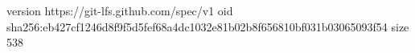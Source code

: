 version https://git-lfs.github.com/spec/v1
oid sha256:eb427cf1246d8f9f5d5fef68a4dc1032e81b02b8f656810bf031b03065093f54
size 538
